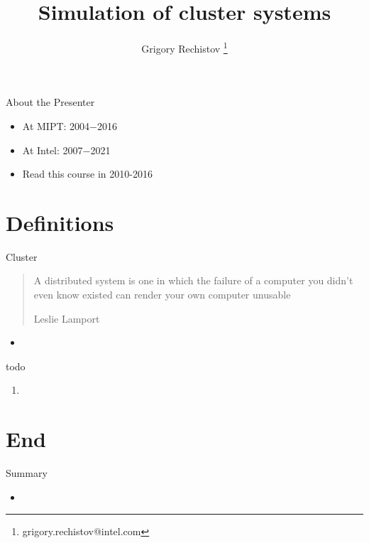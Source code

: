 

\author{Grigory Rechistov \thanks{grigory.rechistov@intel.com}}
\title{Simulation of cluster systems}



\startslides

\begin{frame}{About the Presenter}
\begin{itemize}
\item At MIPT: 2004−2016
\item At Intel: 2007−2021
\item Read this course in 2010-2016
\end{itemize}
\end{frame}



\section{Definitions}


\begin{frame}{Cluster}

\begin{quotation}
A distributed system is one in which the failure of a computer you didn't even know existed can render your own computer unusable

Leslie Lamport
\end{quotation}


\begin{itemize}
    \item 
\end{itemize}

\end{frame}

\begin{frame}{todo}


\begin{enumerate}
    \item 
\end{enumerate}

\end{frame}

\section{End}

\begin{frame}{Summary}
\begin{itemize}
\item 
\end{itemize}
\end{frame}

